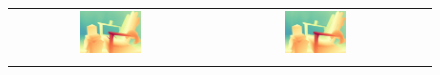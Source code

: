 \begin{figure}[h]
\begin{tabular}{ccc}
        \includegraphics[width=0.32\textwidth]{imgs/middlebury/stereo/Selective/0.jpg} &
        \includegraphics[width=0.32\textwidth]{imgs/middlebury/stereo/Ours/0.jpg} \\ \\
        

\end{tabular}
\end{figure}
